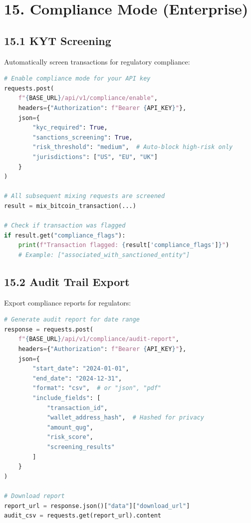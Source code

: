 \documentclass[11pt,a4paper]{article}
\begin{document}
\section{15. Compliance Mode (Enterprise)}

\subsection{15.1 KYT Screening}

Automatically screen transactions for regulatory compliance:

\begin{lstlisting}[language=python]
# Enable compliance mode for your API key
requests.post(
    f"{BASE_URL}/api/v1/compliance/enable",
    headers={"Authorization": f"Bearer {API_KEY}"},
    json={
        "kyc_required": True,
        "sanctions_screening": True,
        "risk_threshold": "medium",  # Auto-block high-risk only
        "jurisdictions": ["US", "EU", "UK"]
    }
)

# All subsequent mixing requests are screened
result = mix_bitcoin_transaction(...)

# Check if transaction was flagged
if result.get("compliance_flags"):
    print(f"Transaction flagged: {result['compliance_flags']}")
    # Example: ["associated_with_sanctioned_entity"]
\end{lstlisting}

\subsection{15.2 Audit Trail Export}

Export compliance reports for regulators:

\begin{lstlisting}[language=python]
# Generate audit report for date range
response = requests.post(
    f"{BASE_URL}/api/v1/compliance/audit-report",
    headers={"Authorization": f"Bearer {API_KEY}"},
    json={
        "start_date": "2024-01-01",
        "end_date": "2024-12-31",
        "format": "csv",  # or "json", "pdf"
        "include_fields": [
            "transaction_id",
            "wallet_address_hash",  # Hashed for privacy
            "amount_qug",
            "risk_score",
            "screening_results"
        ]
    }
)

# Download report
report_url = response.json()["data"]["download_url"]
audit_csv = requests.get(report_url).content
\end{lstlisting}
\end{document}
